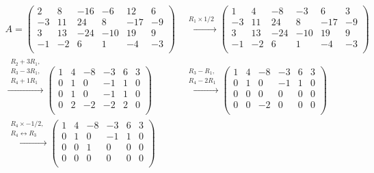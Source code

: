 \documentclass[12pt]{article}
\newenvironment{problem}[2][Problem]{\begin{trivlist}
\item[\hskip \labelsep {\bfseries #1}\hskip \labelsep {\bfseries #2.}]}{\end{trivlist}}
\begin{document}
\begin{problem}{2.i}
\end{problem}
\begin{align*}
A
=
\left( \begin{array}{cccccc}
2 & 8 & -16 & -6 & 12 & 6\\ 
-3 & 11 & 24 & 8 & -17 & -9\\
3 & 13 & -24 & -10 & 19 & 9\\ 
-1 & -2 & 6 & 1 & -4 & -3\\ 
\end{array} \right)
&\xrightarrow{\substack{R_1 \times 1/2}} 
\left( \begin{array}{cccccc}
1 & 4 & -8 & -3 & 6 & 3\\ 
-3 & 11 & 24 & 8 & -17 & -9\\
3 & 13 & -24 & -10 & 19 & 9\\ 
-1 & -2 & 6 & 1 & -4 & -3\\ 
\end{array} \right)\\
\xrightarrow{\substack{R_2 + 3R_1,\\R_3 - 3R_1,\\R_4 + 1R_1}} 
\left( \begin{array}{cccccc}
1 & 4 & -8 & -3 & 6 & 3\\ 
0 & 1 & 0 & -1 & 1 & 0\\
0 & 1 & 0 & -1 & 1 & 0\\ 
0 & 2 & -2 & -2 & 2 & 0\\ 
\end{array} \right)
&\xrightarrow{\substack{R_3 - R_1,\\R_4 - 2R_1}} 
\left( \begin{array}{cccccc}
1 & 4 & -8 & -3 & 6 & 3\\ 
0 & 1 & 0 & -1 & 1 & 0\\
0 & 0 & 0 & 0 & 0 & 0\\ 
0 & 0 & -2 & 0 & 0 & 0\\ 
\end{array} \right)\\
\xrightarrow{\substack{R_4 \times -1/2,\\ R_4\leftrightarrow R_3}} 
\left( \begin{array}{cccccc}
1 & 4 & -8 & -3 & 6 & 3\\ 
0 & 1 & 0 & -1 & 1 & 0\\
0 & 0 & 1 & 0 & 0 & 0\\ 
0 & 0 & 0 & 0 & 0 & 0\\ 
\end{array} \right)\\

\end{align*}
\end{document}
